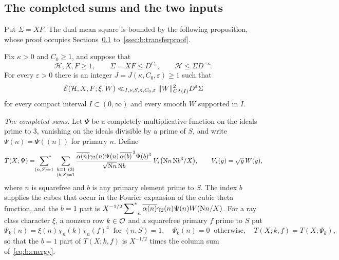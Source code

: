 \subsection{The completed sums and the two inputs}\label{ssec:b:inputs}

Put $\Sigma=XF$. The dual mean square is bounded by the following proposition, whose proof occupies Sections~\ref{ssec:b:inputs} to~\ref{ssec:b:transferproof}.

\begin{proposition}\label{prop:b:canonical}
Fix $\kappa>0$ and $C_0\ge1$, and suppose that
\begin{equation}\label{eq:b:positivegap}
  \mathcal H,X,F\ge1,\qquad\Sigma=XF\le D^{C_0},\qquad\mathcal H\le\Sigma D^{-\kappa}.
\end{equation}
For every $\varepsilon>0$ there is an integer $J=J(\kappa,C_0,\varepsilon)\ge1$ such that
\begin{equation}\label{eq:b:canonical}
  \mathcal{E}(\mathcal H,X,F;\xi,W)\ll_{I,\nu,S,\kappa,C_0,\varepsilon}\|W\|^2_{C^J(I)}D^\varepsilon\Sigma
\end{equation}
for every compact interval $I\subset(0,\infty)$ and every smooth $W$ supported in $I$.
\end{proposition}

\emph{The completed sums.} Let $\Psi$ be a completely multiplicative function on the ideals prime to $3$, vanishing on the ideals divisible by a prime of $S$, and write $\Psi(n)=\Psi((n))$ for primary $n$. Define
\begin{equation}\label{eq:b:T}
  T(X;\Psi)=\sfstar_{(n,S)=1}\ \sum_{\substack{b\equiv1\ (3)\\(b,S)=1}}\frac{\overline{\alpha(n)}\gamma_2(n)\Psi(n)\,\overline{\alpha(b)}^{\,3}\Psi(b)^3}{\sqrt{\NK n}\,\NK b}\,V_*\bigl(\NK n\,\NK b^3/X\bigr),\qquad V_*(y)=\sqrt y\,W(y),
\end{equation}
where $n$ is squarefree and $b$ is any primary element prime to $S$. The index $b$ supplies the cubes that occur in the Fourier expansion of the cubic theta function, and the $b=1$ part is $X^{-1/2}\sideset{}{^*}\sum_n\overline{\alpha(n)}\gamma_2(n)\Psi(n)W(\mathrm{N} n/X)$. For a ray class character $\xi$, a nonzero row $k\in\mathcal{O}$ and a squarefree primary $f$ prime to $S$ put
\begin{equation}\label{eq:b:completedtwist}
  \Psi_k(n)=\xi(n)\chi_n(k)\chi_n(f)^4\ \text{ for }(n,S)=1,\quad\Psi_k(n)=0\ \text{ otherwise},\quad T(X;k,f)=T(X;\Psi_k),
\end{equation}
so that the $b=1$ part of $T(X;k,f)$ is $X^{-1/2}$ times the column sum of~\eqref{eq:b:energy}.

